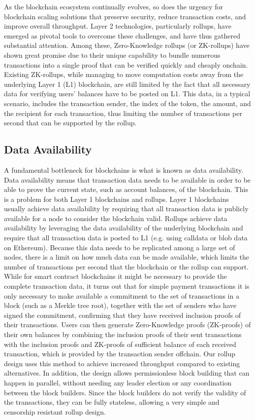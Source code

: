 As the blockchain ecosystem continually evolves, so does the urgency for blockchain scaling solutions that preserve security, reduce transaction costs, and improve overall throughput. Layer 2 technologies, particularly rollups, have emerged as pivotal tools to overcome these challenges, and have thus gathered substantial attention. Among these, Zero-Knowledge rollups (or ZK-rollups) have shown great promise due to their unique capability to bundle numerous transactions into a single proof that can be verified quickly and cheaply onchain. Existing ZK-rollups, while managing to move computation costs away from the underlying Layer 1 (L1) blockchain, are still limited by the fact that all necessary data for verifying users' balances have to be posted on L1. This data, in a typical scenario, includes the transaction sender, the index of the token, the amount, and the recipient for each transaction, thus limiting the number of transactions per second that can be supported by the rollup.

\subsection{Data Availability}

A fundamental bottleneck for blockchains is what is known as data availability. Data availability means that transaction data needs to be available in order to be able to prove the current state, such as account balances, of the blockchain. This is a problem for both Layer 1 blockchains and rollups. Layer 1 blockchains usually achieve data availability by requiring that all transaction data is publicly available for a node to consider the blockchain valid. Rollups achieve data availability by leveraging the data availability of the underlying blockchain and require that all transaction data is posted to L1 (e.g. using calldata or blob data on Ethereum). Because this data needs to be replicated among a large set of nodes, there is a limit on how much data can be made available, which limits the number of transactions per second that the blockchain or the rollup can support. While for smart contract blockchains it might be necessary to provide the complete transaction data, it turns out that for simple payment transactions it is only necessary to make available a commitment to the set of transactions in a block (such as a Merkle tree root), together with the set of senders who have signed the commitment, confirming that they have received inclusion proofs of their transactions. Users can then generate Zero-Knowledge proofs (ZK-proofs) of their own balances by combining the inclusion proofs of their sent transactions with the inclusion proofs and ZK-proofs of sufficient balance of each received transaction, which is provided by the transaction sender offchain. Our rollup design uses this method to achieve increased throughput compared to existing alternatives. In addition, the design allows permissionless block building that can happen in parallel, without needing any leader election or any coordination between the block builders. Since the block builders do not verify the validity of the transactions, they can be fully stateless, allowing a very simple and censorship resistant rollup design.

